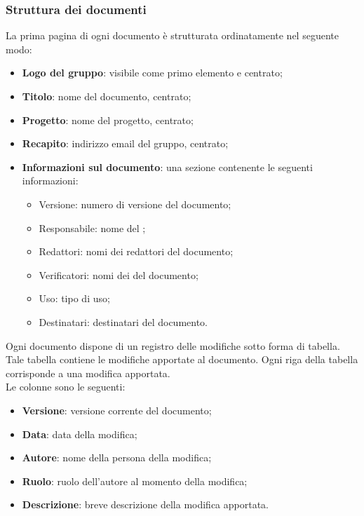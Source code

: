         \subsubsection{Struttura dei documenti}
            La prima pagina di ogni documento è strutturata ordinatamente nel seguente modo:
                \begin{itemize}
                    \item\textbf{Logo del gruppo}: visibile come primo elemento e centrato;
                    \item\textbf{Titolo}: nome del documento, centrato;
                    \item\textbf{Progetto}: nome del progetto, centrato;
                    \item\textbf{Recapito}: indirizzo email del gruppo, centrato;
                    \item\textbf{Informazioni sul documento}: una sezione contenente le seguenti informazioni:
                        \begin{itemize}
                            \item{Versione}: numero di versione del documento;
                            \item{Responsabile}: nome del \roleProjectManager{};
                            \item{Redattori}: nomi dei redattori del documento;
                            \item{Verificatori}: nomi dei \roleVerifierP{} del documento;
                            \item{Uso}: tipo di uso;
                            \item{Destinatari}: destinatari del documento.
                        \end{itemize}
                \end{itemize}
            
            Ogni documento dispone di un registro delle modifiche sotto forma di tabella. Tale tabella contiene le modifiche apportate al documento. Ogni riga della tabella corrisponde a una modifica apportata.\\
            Le colonne sono le seguenti:
                \begin{itemize}
                    \item\textbf{Versione}: versione corrente del documento;
                    \item\textbf{Data}: data della modifica;
                    \item\textbf{Autore}: nome della persona \roleProjectManager{} della modifica;
                    \item\textbf{Ruolo}: ruolo dell'autore al momento della modifica;
                    \item\textbf{Descrizione}: breve descrizione della modifica apportata.
                \end{itemize}
            
